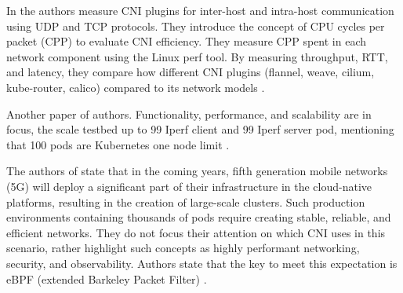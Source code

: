In \cite{9153266} the authors measure CNI plugins for inter-host and intra-host communication using UDP and TCP protocols. They introduce the concept of CPU cycles per packet (CPP) to evaluate CNI efficiency. They measure CPP spent in each network component using the Linux perf tool. By measuring throughput, RTT, and latency, they compare how different CNI plugins (flannel, weave, cilium, kube-router, calico) compared to its network models \cite{9153266}. 

Another paper \cite{9309003} of \cite{9153266} authors. Functionality, performance, and scalability are in focus, the scale testbed up to 99 Iperf client and 99 Iperf server pod, mentioning that 100 pods are Kubernetes one node limit \cite{9309003}. 

The authors of \cite{10138542} state that in the coming years, fifth generation mobile networks (5G) will deploy a significant part of their infrastructure in the cloud-native platforms, resulting in the creation of large-scale clusters. Such production environments containing thousands of pods require creating stable, reliable, and efficient networks. They do not focus their attention on which CNI uses in this scenario, rather highlight such concepts as highly performant networking, security, and observability. Authors state that the key to meet this expectation is eBPF (extended Barkeley Packet Filter) \cite{10138542}. 
